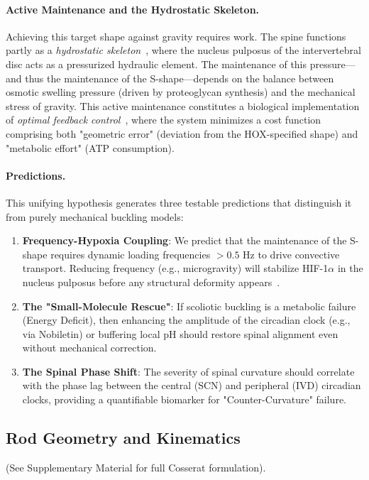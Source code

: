 \documentclass[11pt,a4paper]{article}
\begin{document}
\paragraph{Active Maintenance and the Hydrostatic Skeleton.}
Achieving this target shape against gravity requires work. The spine functions partly as a \emph{hydrostatic skeleton}~\cite{kier1985hydrostatic}, where the nucleus pulposus of the intervertebral disc acts as a pressurized hydraulic element. The maintenance of this pressure---and thus the maintenance of the S-shape---depends on the balance between osmotic swelling pressure (driven by proteoglycan synthesis) and the mechanical stress of gravity. This active maintenance constitutes a biological implementation of \emph{optimal feedback control}~\cite{todorov2002optimal}, where the system minimizes a cost function comprising both "geometric error" (deviation from the HOX-specified shape) and "metabolic effort" (ATP consumption).

\paragraph{Predictions.}
This unifying hypothesis generates three testable predictions that distinguish it from purely mechanical buckling models:
\begin{enumerate}
    \item \textbf{Frequency-Hypoxia Coupling}: We predict that the maintenance of the S-shape requires dynamic loading frequencies $>0.5$ Hz to drive convective transport. Reducing frequency (e.g., microgravity) will stabilize HIF-1$\alpha$ in the nucleus pulposus before any structural deformity appears~\cite{ugur2024hypoxia}.
    \item \textbf{The "Small-Molecule Rescue"}: If scoliotic buckling is a metabolic failure (Energy Deficit), then enhancing the amplitude of the circadian clock (e.g., via Nobiletin) or buffering local pH should restore spinal alignment even without mechanical correction.
    \item \textbf{The Spinal Phase Shift}: The severity of spinal curvature should correlate with the phase lag between the central (SCN) and peripheral (IVD) circadian clocks, providing a quantifiable biomarker for "Counter-Curvature" failure.
\end{enumerate}

\subsection{Rod Geometry and Kinematics} \label{sec:rod_geometry}
(See Supplementary Material for full Cosserat formulation).
\end{document}
